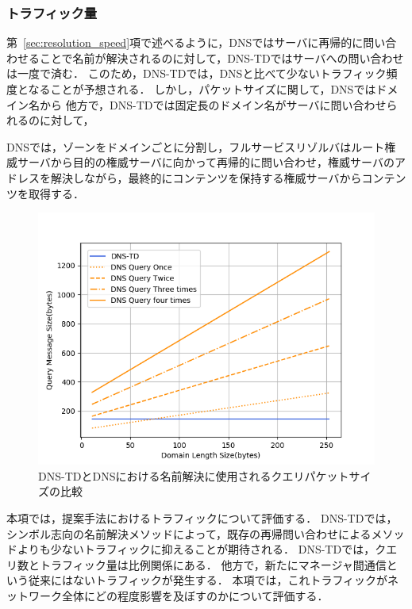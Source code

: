 \subsubsection{トラフィック量}
第~\ref{sec:resolution_speed}項で述べるように，DNSではサーバに再帰的に問い合わせることで名前が解決されるのに対して，DNS-TDではサーバへの問い合わせは一度で済む．
このため，DNS-TDでは，DNSと比べて少ないトラフィック頻度となることが予想される．
しかし，パケットサイズに関して，DNSではドメイン名から
他方で，DNS-TDでは固定長のドメイン名がサーバに問い合わせられるのに対して，

DNSでは，ゾーンをドメインごとに分割し，フルサービスリゾルバはルート権威サーバから目的の権威サーバに向かって再帰的に問い合わせ，権威サーバのアドレスを解決しながら，最終的にコンテンツを保持する権威サーバからコンテンツを取得する．

\begin{figure}[h]
 \centering
 \includegraphics[scale=0.8]{figure/length-size.png}
 \caption{DNS-TDとDNSにおける名前解決に使用されるクエリパケットサイズの比較}
 \label{fig:length-size}
\end{figure}

本項では，提案手法におけるトラフィックについて評価する．
DNS-TDでは，シンボル志向の名前解決メソッドによって，既存の再帰問い合わせによるメソッドよりも少ないトラフィックに抑えることが期待される．
DNS-TDでは，クエリ数とトラフィック量は比例関係にある．
他方で，新たにマネージャ間通信という従来にはないトラフィックが発生する．
本項では，これトラフィックがネットワーク全体にどの程度影響を及ぼすのかについて評価する．

